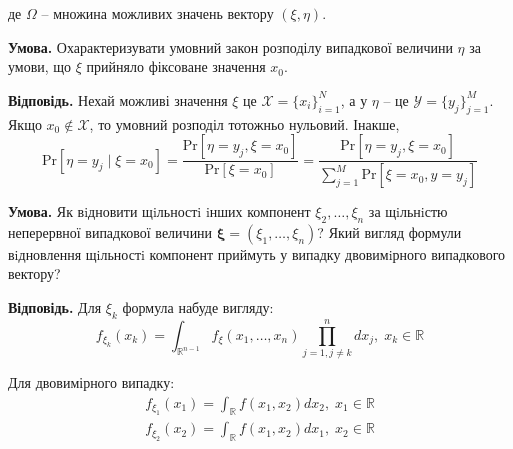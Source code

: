 \documentclass[oneside,solution]{karazin-prob-theory-assign}
\begin{document}
де $\Omega$ -- множина можливих значень вектору $(\xi,\eta)$. 


\hspace{20px}\textbf{Умова.} Охарактеризувати умовний закон розподілу випадкової величини $\eta$ за умови, що $\xi$ прийняло фіксоване значення $x_0$.

\textbf{Відповідь.} Нехай можливі значення $\xi$ це $\mathcal{X} = \{x_i\}_{i=1}^N$, а у $\eta$ -- це $\mathcal{Y} = \{y_j\}_{j=1}^M$. Якщо $x_0 \notin \mathcal{X}$, то умовний розподіл тотожньо нульовий. Інакше, 
\begin{equation}
    \text{Pr}[\eta=y_j \mid \xi = x_0] = \frac{\text{Pr}[\eta=y_j, \xi = x_0]}{\text{Pr}[\xi=x_0]} = \frac{\text{Pr}[\eta=y_j,\xi=x_0]}{\sum_{j=1}^M \text{Pr}[\xi=x_0, y = y_j]}
\end{equation}


\hspace{20px}\textbf{Умова.} Як вiдновити щiльностi iнших компонент $\xi_2,\dots,\xi_n$ за щiльнiстю неперервної випадкової величини $\boldsymbol{\xi} = (\xi_1,\dots,\xi_n)$? Який вигляд формули вiдновлення щiльностi компонент приймуть у випадку двовимiрного випадкового вектору?

\textbf{Відповідь.} Для $\xi_k$ формула набуде вигляду:
\begin{equation}
    f_{\xi_k}(x_k) = \int_{\mathbb{R}^{n-1}}f_{\xi}(x_1,\dots,x_n)\prod_{j=1,j\neq k}^n dx_j, \; x_k \in \mathbb{R}
\end{equation}

Для двовимірного випадку:
\begin{gather}
    f_{\xi_1}(x_1) = \int_{\mathbb{R}}f(x_1,x_2)dx_2, \; x_1 \in \mathbb{R} \\
    f_{\xi_2}(x_2) = \int_{\mathbb{R}}f(x_1,x_2)dx_1, \; x_2 \in \mathbb{R}
\end{gather}
\end{document}
